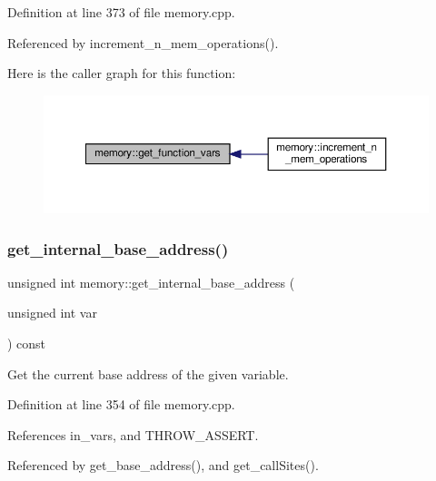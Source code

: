 Definition at line 373 of file memory.\+cpp.



Referenced by increment\+\_\+n\+\_\+mem\+\_\+operations().

Here is the caller graph for this function\+:
\nopagebreak
\begin{figure}[H]
\begin{center}
\leavevmode
\includegraphics[width=350pt]{d8/d99/classmemory_a6ce2b973f83c743754cfa1bbe1b2a150_icgraph}
\end{center}
\end{figure}
\mbox{\label{classmemory_a9a124e4167f009e2f3c1b4343c42c2d0}} 
\subsubsection{\texorpdfstring{get\+\_\+internal\+\_\+base\+\_\+address()}{get\_internal\_base\_address()}}
{\footnotesize\ttfamily unsigned int memory\+::get\+\_\+internal\+\_\+base\+\_\+address (\begin{DoxyParamCaption}\item[{unsigned int}]{var }\end{DoxyParamCaption}) const}



Get the current base address of the given variable. 



Definition at line 354 of file memory.\+cpp.



References in\+\_\+vars, and T\+H\+R\+O\+W\+\_\+\+A\+S\+S\+E\+RT.



Referenced by get\+\_\+base\+\_\+address(), and get\+\_\+call\+Sites().

